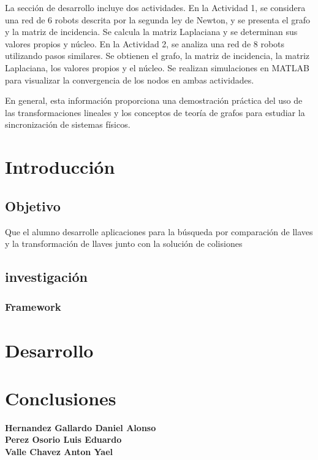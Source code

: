 \documentclass{report}
\begin{document}
La sección de desarrollo incluye dos actividades. En la Actividad 1, se considera una red de 6 robots descrita por la segunda ley de Newton, y se presenta el grafo y la matriz de incidencia. Se calcula la matriz Laplaciana y se determinan sus valores propios y núcleo. En la Actividad 2, se analiza una red de 8 robots utilizando pasos similares. Se obtienen el grafo, la matriz de incidencia, la matriz Laplaciana, los valores propios y el núcleo. Se realizan simulaciones en MATLAB para visualizar la convergencia de los nodos en ambas actividades.

En general, esta información proporciona una demostración práctica del uso de las transformaciones lineales y los conceptos de teoría de grafos para estudiar la sincronización de sistemas físicos.



\tableofcontents

  

\chapter{Introducción} 
    \section{Objetivo}
    Que el alumno desarrolle aplicaciones para la búsqueda por comparación de llaves y la
    transformación de llaves junto con la solución de colisiones
    \section{investigación}
      \subsection*{Framework}
\newpage
\chapter{Desarrollo}

\chapter{Conclusiones}
\textbf{Hernandez Gallardo Daniel Alonso} \\
\newpage
\textbf{Perez Osorio Luis Eduardo} \\

\newpage
\textbf{Valle Chavez Anton Yael} \\
\newpage
\nocite{*}
  \newpage

\end{document}
